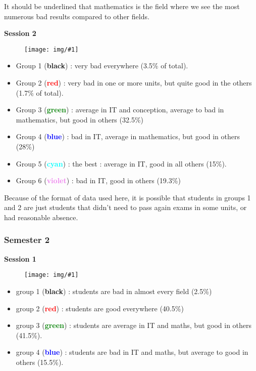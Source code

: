 \documentclass[11pt, a4paper]{article}
\newcommand\image[2]{
	\begin{figure}[H]
	\centering
	\texttt{[image: img/\#1]}
	\end{figure}
}
\begin{document}
    It should be underlined that mathematics is the field where we see the most numerous bad results compared to other fields.

    \newpage

    \textbf{\large{Session 2}}

    \image{image13.png}{480px}

    \begin{multicols}{2}
        \begin{itemize}
            \item Group 1 (\textbf{black}) : very bad everywhere (3.5\% of total).
            \item Group 2 (\textbf{\textcolor{red}{red}}) : very bad in one or more units, but quite good in the others (1.7\% of total).
            \item Group 3 (\textbf{\textcolor{green}{green}}) : average in IT and conception, average to bad in mathematics, but good in others (32.5\%)
            \item Group 4 (\textbf{\textcolor{blue}{blue}}) : bad in IT, average in mathematics, but good in others (28\%)
            \item Group 5 (\textbf{\textcolor{cyan}{cyan}}) : the best : average in IT, good in all others (15\%).
            \item Group 6 (\textbf{\textcolor{violet}{violet}}) : bad in IT, good in others (19.3\%)\\
        \end{itemize}
    \end{multicols}
    
    \newpage
    Because of the format of data used here, it is possible that students in groups 1 and 2 are just students that didn’t need to pass again exams in some units, or had reasonable absence.

    \subsubsection{Semester 2}

    \textbf{\large{Session 1}}

    \image{image05.png}{480px}
    
    \begin{multicols}{2}
        \begin{itemize}
            \item group 1 (\textbf{black}) : students are bad in almost every field (2.5\%)
            \item group 2 (\textbf{\textcolor{red}{red}}) : students are good everywhere (40.5\%)\\
            \item group 3 (\textbf{\textcolor{green}{green}}) : students are average in IT and maths, but good in others (41.5\%).
            \item group 4 (\textbf{\textcolor{blue}{blue}}) : students are bad in IT and maths, but average to good in others (15.5\%).
        \end{itemize}
    \end{multicols}
\end{document}
